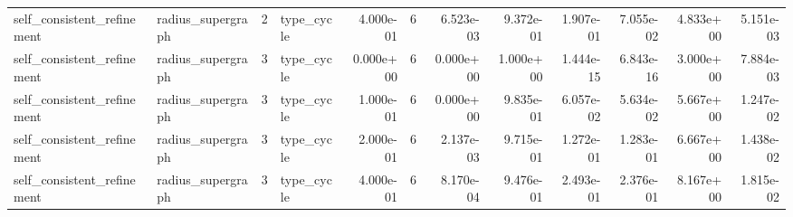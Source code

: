 \begin{tabular}{llrlrrrrrrrr}
self_consistent_refinement & radius_supergraph & 2 & type_cycle & 4.000e-01 & 6 & 6.523e-03 & 9.372e-01 & 1.907e-01 & 7.055e-02 & 4.833e+00 & 5.151e-03 \\
self_consistent_refinement & radius_supergraph & 3 & type_cycle & 0.000e+00 & 6 & 0.000e+00 & 1.000e+00 & 1.444e-15 & 6.843e-16 & 3.000e+00 & 7.884e-03 \\
self_consistent_refinement & radius_supergraph & 3 & type_cycle & 1.000e-01 & 6 & 0.000e+00 & 9.835e-01 & 6.057e-02 & 5.634e-02 & 5.667e+00 & 1.247e-02 \\
self_consistent_refinement & radius_supergraph & 3 & type_cycle & 2.000e-01 & 6 & 2.137e-03 & 9.715e-01 & 1.272e-01 & 1.283e-01 & 6.667e+00 & 1.438e-02 \\
self_consistent_refinement & radius_supergraph & 3 & type_cycle & 4.000e-01 & 6 & 8.170e-04 & 9.476e-01 & 2.493e-01 & 2.376e-01 & 8.167e+00 & 1.815e-02 \\
\bottomrule
\end{tabular}
